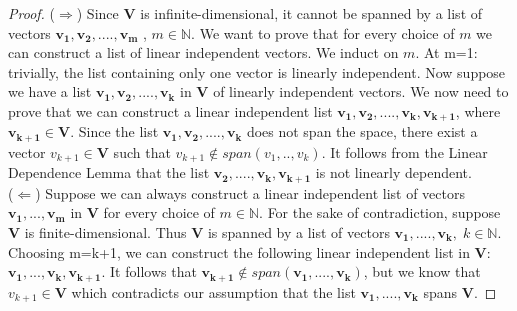 \documentclass{article}
\begin{document}
\begin{enumerate}
\begin{proof}
($\Rightarrow$) Since $\bm{V}$ is infinite-dimensional, it cannot be spanned by a list of vectors $\bm{v_{1}},\bm{v_{2}},....,\bm{v_{m}}$  ,  $m \in \mathbb{N}$. We want to prove that for every choice of $m$ we can construct a list of linear independent vectors. We induct on $m$. At m=1: trivially, the list containing only one vector is linearly independent. Now suppose we have a list $\bm{v_{1}},\bm{v_{2}},....,\bm{v_{k}}$ in $\bm{V}$ of linearly independent vectors. We now need to prove that we can construct a linear independent list $\bm{v_{1}},\bm{v_{2}},....,\bm{v_{k}},\bm{v_{k+1}}$, where $\bm{v_{k+1}} \in \bm{V}$. Since the list  $\bm{v_{1}},\bm{v_{2}},....,\bm{v_{k}}$ does not span the space, there exist a vector $v_{k+1} \in \bm{V}$ such that $v_{k+1} \not \in span(v_{1},..,v_{k})$. It follows from the Linear Dependence Lemma that the list $\bm{v_{2}},....,\bm{v_{k}},\bm{v_{k+1}}$ is not linearly dependent. \\ ($\Leftarrow$) Suppose we can always construct a linear independent list of vectors $\bm{v_{1},...,\bm{v_{m}}}$ in $\bm{V}$ for every choice of $m \in \mathbb{N}$. For the sake of contradiction, suppose $\bm{V}$ is finite-dimensional. Thus $\bm{V}$ is spanned by a list of vectors $\bm{v_{1},....,\bm{v_k}},\; k \in \mathbb{N}$. Choosing m=k+1, we can construct the following linear independent list in $\bm{V}$: $\bm{v_1,...,v_k,v_{k+1}}$. It follows that $\bm{v_{k+1}} \not \in span(\bm{v_1},....,\bm{v_k})$, but we know that $v_{k+1} \in \bm{V}$ which contradicts our assumption that the list $\bm{v_1},....,\bm{v_k}$ spans $\bm{V}$.
\end{proof}
\end{enumerate}
\end{document}

